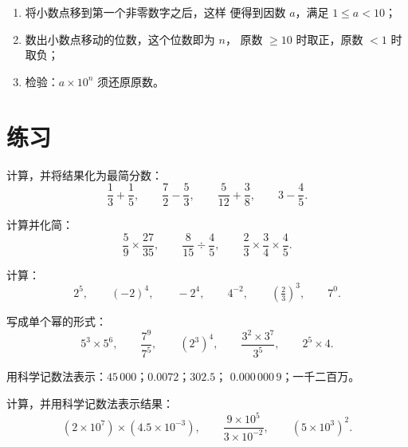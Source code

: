 \begin{method}[将数写成科学记数法]\label{met:g9:fractions:scientific}
\begin{enumerate}
  \item 将小数点移到第一个非零数字之后，这样
        便得到因数 $a$，满足 $1 \leq a < 10$；
  \item 数出小数点移动的位数，这个位数即为 $n$，
        原数 $\geq 10$ 时取正，原数
        $< 1$ 时取负；
  \item 检验：$a \times 10^n$ 须还原原数。
\end{enumerate}
\end{method}

\section{练习}

\begin{exercise}[$\star$]\label{exo:g9:fractions:1}
计算，并将结果化为最简分数：
\[
\frac13 + \frac15, \qquad
\frac72 - \frac53, \qquad
\frac{5}{12} + \frac38, \qquad
3 - \frac45 .
\]
\end{exercise}

\begin{exercise}[$\star$]\label{exo:g9:fractions:2}
计算并化简：
\[
\frac59 \times \frac{27}{35}, \qquad
\frac{8}{15} \div \frac{4}{5}, \qquad
\frac23 \times \frac34 \times \frac45 .
\]
\end{exercise}

\begin{exercise}[$\star$]\label{exo:g9:fractions:3}
计算：
\[
2^5, \qquad (-2)^4, \qquad -2^4, \qquad 4^{-2}, \qquad
\left(\tfrac23\right)^3, \qquad 7^0 .
\]
\end{exercise}

\begin{exercise}[$\star$]\label{exo:g9:fractions:4}
写成单个幂的形式：
\[
5^3 \times 5^6, \qquad
\frac{7^9}{7^5}, \qquad
\left(2^3\right)^4, \qquad
\frac{3^2 \times 3^7}{3^5}, \qquad
2^5 \times 4 .
\]
\end{exercise}

\begin{exercise}[$\star$]\label{exo:g9:fractions:5}
用科学记数法表示：$45\,000$；$0.0072$；$302.5$；
$0.000\,000\,9$；一千二百万。
\end{exercise}

\begin{exercise}[$\star\star$]\label{exo:g9:fractions:6}
计算，并用科学记数法表示结果：
\[
(2 \times 10^7) \times (4.5 \times 10^{-3}),
\qquad
\frac{9 \times 10^5}{3 \times 10^{-2}},
\qquad
(5 \times 10^3)^2 .
\]
\end{exercise}

